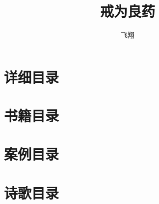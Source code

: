 \documentclass{ctexart}
\title{戒为良药}
\author{飞翔}
\date{}
\begin{document}
\maketitle
\begin{multicols}{2}
\end{multicols}\clearpage




















\clearpage\appendix

\section{详细目录}

\setcounter{tocdepth}{5}
\renewcommand*{\contentsname}{}
\begin{multicols}{2}
    \tableofcontents
\end{multicols}

\section{书籍目录}
\renewcommand*{\listtheoremname}{}
\begin{multicols}{2}
    \listoftheorems[ignoreall, show = book]
\end{multicols}

\section{案例目录}
\renewcommand*{\listtheoremname}{}
\begin{multicols}{2}
    \listoftheorems[ignoreall, show = case]
\end{multicols}

\section{诗歌目录}
\renewcommand*{\listtheoremname}{}
\begin{multicols}{2}
    \listoftheorems[ignoreall, show = poem]
\end{multicols}
\end{document}

